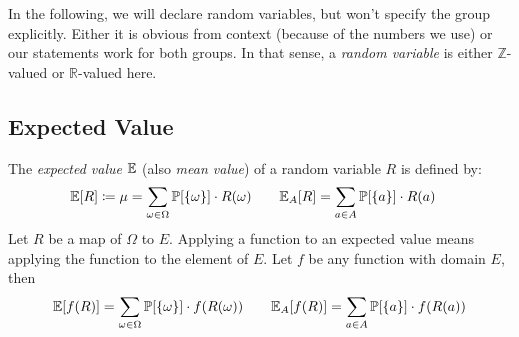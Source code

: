 In the following, we will declare random variables, but won't specify the group explicitly.
Either it is obvious from context (because of the numbers we use) or our statements work for both groups.
In that sense, a \emph{random variable} is either {$\mathbb Z$-valued} or {$\mathbb R$}-valued here.


\subsection{Expected Value}
\label{sec:bp-ev}
%
\begin{definition}
  The \emph{expected value} $\mathbb E$ (also \emph{mean value}) of a random variable $R$ is defined by:
  \begin{align}
    \mathbb E[R]      &\coloneqq \mu
               = \sum_{\omega \in \Omega} \mathbb P[\left\{\omega\right\}] \cdot R(\omega) \qquad
    \mathbb E_{A}[R]  = \sum_{a \in A} \mathbb P[\left\{a\right\}] \cdot R(a)
  \end{align}
  Let $R$ be a map of $\Omega$ to $E$.
  Applying a function to an expected value means applying the function to the element of $E$.
  Let $f$ be any function with domain $E$, then
  \[
    \mathbb E[f(R)]      = \sum_{\omega \in \Omega} \mathbb P[\left\{\omega\right\}] \cdot f(R(\omega)) \qquad
    \mathbb E_{A}[f(R)]  = \sum_{a \in A} \mathbb P[\left\{a\right\}] \cdot f(R(a))
  \]
\end{definition}

